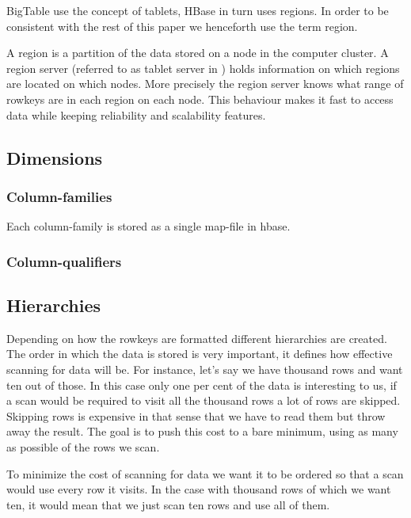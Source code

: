 \documentclass[a4paper,10pt]{book}
\begin{document}
BigTable use the concept of tablets, HBase in turn uses regions. In order
to be consistent with the rest of this paper we henceforth use the term
region.

A region is a partition of the data stored on a node in the computer
cluster. A region server (referred to as tablet server in \cite{mapreduce})
holds information on which regions are located on which nodes. More
precisely the region server knows what range of rowkeys are in each region
on each node. This behaviour makes it fast to access data while keeping
reliability and scalability features.



\subsection{Dimensions}

\subsubsection{Column-families}

Each column-family is stored as a single map-file in hbase.


\subsubsection{Column-qualifiers}



\subsection{Hierarchies}

Depending on how the rowkeys are formatted different hierarchies are
created. The order in which the data is stored is very important, it
defines how effective scanning for data will be. For instance, let's say we
have thousand rows and want ten out of those. In this case only one per
cent of the data is interesting to us, if a scan would be required to visit
all the thousand rows a lot of rows are skipped. Skipping rows is expensive
in that sense that we have to read them but throw away the result. The goal
is to push this cost to a bare minimum, using as many as possible of the
rows we scan.

To minimize the cost of scanning for data we want it to be ordered so that
a scan would use every row it visits. In the case with thousand rows of
which we want ten, it would mean that we just scan ten rows and use all of
them.
\end{document}
